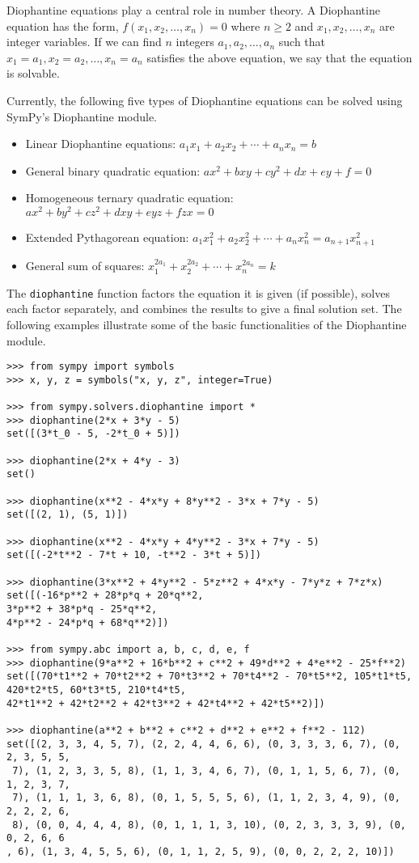 Diophantine equations play a central role in number theory.  A
Diophantine equation has the form, $f(x_1, x_2, \dotsc, x_n) = 0$ where $n \geq
2$ and $x_1, x_2, \dotsc, x_n$ are integer variables. If we can find $n$
integers $a_1, a_2, \dotsc, a_n$ such that $x_1 = a_1, x_2 = a_2, \dotsc, x_n =
a_n$ satisfies the above equation, we say that the equation is solvable.

Currently, the following five types of Diophantine equations can be solved using
SymPy's Diophantine module.

\begin{itemize}
    \item Linear Diophantine equations: $a_1x_1 + a_2x_2 + \dotsb + a_{n}x_{n} = b$
    \item General binary quadratic equation: $ax^2 + bxy + cy^2 + dx + ey + f = 0$
    \item Homogeneous ternary quadratic equation: $ax^2 + by^2 + cz^2 + dxy + eyz + fzx = 0$
    \item Extended Pythagorean equation: $a_{1}x_{1}^2 + a_{2}x_{2}^2 + \dotsb + a_{n}x_{n}^2 = a_{n+1}x_{n+1}^2$
    \item General sum of squares: $x_{1}^{2a_1} + x_{2}^{2a_2} + \dotsb + x_{n}^{2a_n} = k$
\end{itemize}

The \verb|diophantine| function factors the equation it is given (if
possible), solves each factor separately, and combines the results to give
a final solution set.
The following examples illustrate some of the
basic functionalities of the Diophantine module.

\begin{verbatim}
>>> from sympy import symbols
>>> x, y, z = symbols("x, y, z", integer=True)

>>> from sympy.solvers.diophantine import *
>>> diophantine(2*x + 3*y - 5)
set([(3*t_0 - 5, -2*t_0 + 5)])

>>> diophantine(2*x + 4*y - 3)
set()

>>> diophantine(x**2 - 4*x*y + 8*y**2 - 3*x + 7*y - 5)
set([(2, 1), (5, 1)])

>>> diophantine(x**2 - 4*x*y + 4*y**2 - 3*x + 7*y - 5)
set([(-2*t**2 - 7*t + 10, -t**2 - 3*t + 5)])

>>> diophantine(3*x**2 + 4*y**2 - 5*z**2 + 4*x*y - 7*y*z + 7*z*x)
set([(-16*p**2 + 28*p*q + 20*q**2,
3*p**2 + 38*p*q - 25*q**2,
4*p**2 - 24*p*q + 68*q**2)])

>>> from sympy.abc import a, b, c, d, e, f
>>> diophantine(9*a**2 + 16*b**2 + c**2 + 49*d**2 + 4*e**2 - 25*f**2)
set([(70*t1**2 + 70*t2**2 + 70*t3**2 + 70*t4**2 - 70*t5**2, 105*t1*t5,
420*t2*t5, 60*t3*t5, 210*t4*t5,
42*t1**2 + 42*t2**2 + 42*t3**2 + 42*t4**2 + 42*t5**2)])

>>> diophantine(a**2 + b**2 + c**2 + d**2 + e**2 + f**2 - 112)
set([(2, 3, 3, 4, 5, 7), (2, 2, 4, 4, 6, 6), (0, 3, 3, 3, 6, 7), (0, 2, 3, 5, 5,
 7), (1, 2, 3, 3, 5, 8), (1, 1, 3, 4, 6, 7), (0, 1, 1, 5, 6, 7), (0, 1, 2, 3, 7,
 7), (1, 1, 1, 3, 6, 8), (0, 1, 5, 5, 5, 6), (1, 1, 2, 3, 4, 9), (0, 2, 2, 2, 6,
 8), (0, 0, 4, 4, 4, 8), (0, 1, 1, 1, 3, 10), (0, 2, 3, 3, 3, 9), (0, 0, 2, 6, 6
, 6), (1, 3, 4, 5, 5, 6), (0, 1, 1, 2, 5, 9), (0, 0, 2, 2, 2, 10)])
\end{verbatim}
